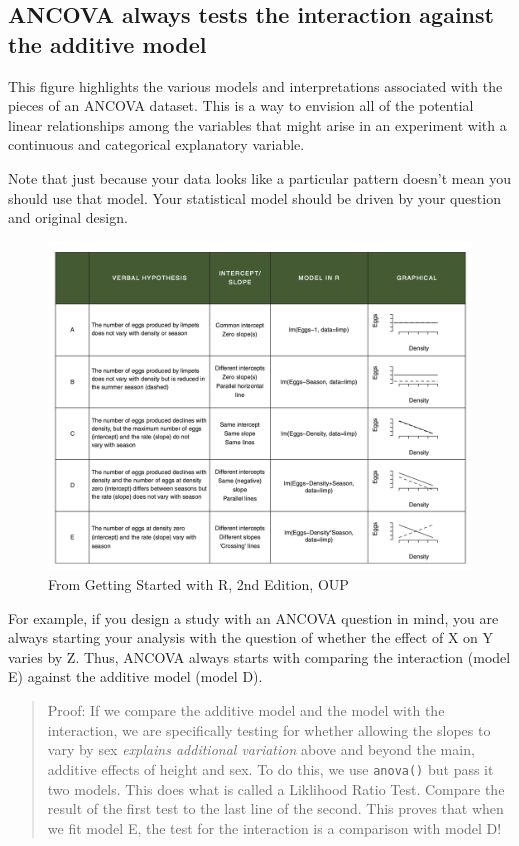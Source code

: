 \documentclass[
]{book}
\begin{document}
\hypertarget{ancova-always-tests-the-interaction-against-the-additive-model}{%
\subsection{ANCOVA always tests the interaction against the additive model}\label{ancova-always-tests-the-interaction-against-the-additive-model}}

This figure highlights the various models and interpretations associated with the pieces of an ANCOVA dataset. This is a way to envision all of the potential linear relationships among the variables that might arise in an experiment with a continuous and categorical explanatory variable.

Note that just because your data looks like a particular pattern doesn't mean you should use that model. Your statistical model should be driven by your question and original design.

\begin{figure}
\includegraphics[width=20.56in]{images/GSwithR_Grid} \caption{From Getting Started with R, 2nd Edition, OUP}\label{fig:unnamed-chunk-61}
\end{figure}

For example, if you design a study with an ANCOVA question in mind, you are always starting your analysis with the question of whether the effect of X on Y varies by Z. Thus, ANCOVA always starts with comparing the interaction (model E) against the additive model (model D).

\begin{quote}
Proof: If we compare the additive model and the model with the interaction, we are specifically testing for whether allowing the slopes to vary by sex \emph{explains additional variation} above and beyond the main, additive effects of height and sex. To do this, we use \texttt{anova()} but pass it two models. This does what is called a Liklihood Ratio Test.
Compare the result of the first test to the last line of the second. This proves that when we fit model E, the test for the interaction is a comparison with model D!
\end{quote}
\end{document}
